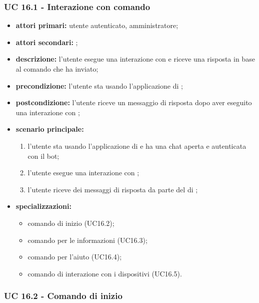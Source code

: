 	\subsubsection{UC 16.1 - Interazione con comando}

	\begin{itemize}
		\item \textbf{attori primari:} utente autenticato, amministratore;
		\item \textbf{attori secondari:} ;
		\item \textbf{descrizione:} l'utente esegue una interazione con  e riceve una risposta in base al comando che ha inviato;
		\item \textbf{precondizione:} l'utente sta usando l'applicazione di ;
		\item \textbf{postcondizione:} l'utente riceve un messaggio di risposta dopo aver eseguito una interazione con ;
		\item \textbf{scenario principale:}
		\begin{enumerate}
			\item l'utente sta usando l'applicazione di  e ha una chat aperta e autenticata con il bot;
			\item l'utente esegue una interazione con ;
			\item l'utente riceve dei messaggi di risposta da parte del  di ;
		\end{enumerate}
		\item \textbf{specializzazioni:}
		\begin{itemize}
			\item comando di inizio (UC16.2);
			\item comando per le informazioni (UC16.3);
			\item comando per l'aiuto (UC16.4);
			\item comando di interazione con i dispositivi (UC16.5).
		\end{itemize}
	\end{itemize}

	\subsubsection{UC 16.2 - Comando di inizio}


